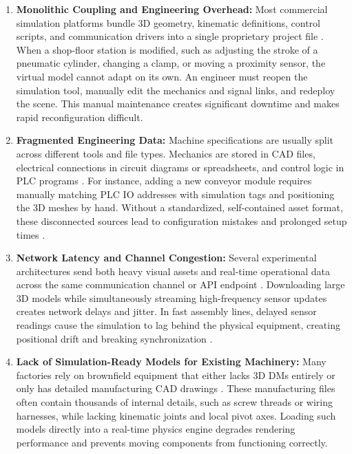 \begin{enumerate}
    \item \textbf{Monolithic Coupling and Engineering Overhead:} Most commercial simulation platforms bundle 3D geometry, kinematic definitions, control scripts, and communication drivers into a single proprietary project file \cite{Striffler2023,Koch2024}. When a shop-floor station is modified, such as adjusting the stroke of a pneumatic cylinder, changing a clamp, or moving a proximity sensor, the virtual model cannot adapt on its own. An engineer must reopen the simulation tool, manually edit the mechanics and signal links, and redeploy the scene. This manual maintenance creates significant downtime and makes rapid reconfiguration difficult.

    \item \textbf{Fragmented Engineering Data:} Machine specifications are usually split across different tools and file types. Mechanics are stored in \gls{CAD} files, electrical connections in circuit diagrams or spreadsheets, and control logic in \gls{PLC} programs \cite{Luder2020,Ahvanouee2025}. For instance, adding a new conveyor module requires manually matching \gls{PLC} \gls{IO} addresses with simulation tags and positioning the 3D meshes by hand. Without a standardized, self-contained asset format, these disconnected sources lead to configuration mistakes and prolonged setup times \cite{Gollner2022,Schaper2025}.

    \item \textbf{Network Latency and Channel Congestion:} Several experimental architectures send both heavy visual assets and real-time operational data across the same communication channel or \gls{API} endpoint \cite{Gil2024,Pajpach2023}. Downloading large 3D models while simultaneously streaming high-frequency sensor updates creates network delays and jitter. In fast assembly lines, delayed sensor readings cause the simulation to lag behind the physical equipment, creating positional drift and breaking synchronization \cite{Kritzinger2018}.

    \item \textbf{Lack of Simulation-Ready Models for Existing Machinery:} Many factories rely on brownfield equipment that either lacks 3D \glspl{DM} entirely or only has detailed manufacturing \gls{CAD} drawings \cite{Lee2014,Striffler2023}. These manufacturing files often contain thousands of internal details, such as screw threads or wiring harnesses, while lacking kinematic joints and local pivot axes. Loading such models directly into a real-time physics engine degrades rendering performance and prevents moving components from functioning correctly.
\end{enumerate}

